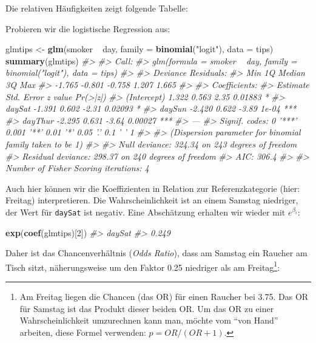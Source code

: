 \documentclass[12pt,ngerman,]{book}
\makeatletter
\newenvironment{Shaded}{\begin{snugshade}}{\end{snugshade}}
\newcommand{\KeywordTok}[1]{\textcolor[rgb]{0.13,0.29,0.53}{\textbf{{#1}}}}
\newcommand{\DataTypeTok}[1]{\textcolor[rgb]{0.13,0.29,0.53}{{#1}}}
\newcommand{\DecValTok}[1]{\textcolor[rgb]{0.00,0.00,0.81}{{#1}}}
\newcommand{\StringTok}[1]{\textcolor[rgb]{0.31,0.60,0.02}{{#1}}}
\newcommand{\CommentTok}[1]{\textcolor[rgb]{0.56,0.35,0.01}{\textit{{#1}}}}
\newcommand{\NormalTok}[1]{{#1}}
\let\rmarkdownfootnote\footnote%
\def\footnote{\protect\rmarkdownfootnote}
\newenvironment{kframe}{%
\medskip{}
\setlength{\fboxsep}{.8em}
 \def\at@end@of@kframe{}%
 \ifinner\ifhmode%
  \def\at@end@of@kframe{\end{minipage}}%
  \begin{minipage}{\columnwidth}%
 \fi\fi%
 \def\FrameCommand##1{\hskip\@totalleftmargin \hskip-\fboxsep
 \colorbox{shadecolor}{##1}\hskip-\fboxsep
     \hskip-\linewidth \hskip-\@totalleftmargin \hskip\columnwidth}%
 \MakeFramed {\advance\hsize-\width
   \@totalleftmargin\z@ \linewidth\hsize
   \@setminipage}}%
 {\par\unskip\endMakeFramed%
 \at@end@of@kframe}
\renewenvironment{Shaded}{\begin{kframe}}{\end{kframe}}
\makeatother
\begin{document}
Die relativen Häufigkeiten zeigt folgende Tabelle:

Probieren wir die logistische Regression aus:

\begin{Shaded}
\begin{Highlighting}[]
\NormalTok{glmtips <-}\StringTok{ }\KeywordTok{glm}\NormalTok{(smoker ~}\StringTok{ }\NormalTok{day, }
               \DataTypeTok{family =} \KeywordTok{binomial}\NormalTok{(}\StringTok{"logit"}\NormalTok{),}
               \DataTypeTok{data =} \NormalTok{tips)}
\KeywordTok{summary}\NormalTok{(glmtips)}
\CommentTok{#> }
\CommentTok{#> Call:}
\CommentTok{#> glm(formula = smoker ~ day, family = binomial("logit"), data = tips)}
\CommentTok{#> }
\CommentTok{#> Deviance Residuals: }
\CommentTok{#>    Min      1Q  Median      3Q     Max  }
\CommentTok{#> -1.765  -0.801  -0.758   1.207   1.665  }
\CommentTok{#> }
\CommentTok{#> Coefficients:}
\CommentTok{#>             Estimate Std. Error z value Pr(>|z|)    }
\CommentTok{#> (Intercept)    1.322      0.563    2.35  0.01883 *  }
\CommentTok{#> daySat        -1.391      0.602   -2.31  0.02093 *  }
\CommentTok{#> daySun        -2.420      0.622   -3.89    1e-04 ***}
\CommentTok{#> dayThur       -2.295      0.631   -3.64  0.00027 ***}
\CommentTok{#> ---}
\CommentTok{#> Signif. codes:  0 '***' 0.001 '**' 0.01 '*' 0.05 '.' 0.1 ' ' 1}
\CommentTok{#> }
\CommentTok{#> (Dispersion parameter for binomial family taken to be 1)}
\CommentTok{#> }
\CommentTok{#>     Null deviance: 324.34  on 243  degrees of freedom}
\CommentTok{#> Residual deviance: 298.37  on 240  degrees of freedom}
\CommentTok{#> AIC: 306.4}
\CommentTok{#> }
\CommentTok{#> Number of Fisher Scoring iterations: 4}
\end{Highlighting}
\end{Shaded}

Auch hier können wir die Koeffizienten in Relation zur Referenzkategorie
(hier: Freitag) interpretieren. Die Wahrscheinlichkeit ist an einem
Samstag niedriger, der Wert für \texttt{daySat} ist negativ. Eine
Abschätzung erhalten wir wieder mit \(e^{\beta_i}\):

\begin{Shaded}
\begin{Highlighting}[]
\KeywordTok{exp}\NormalTok{(}\KeywordTok{coef}\NormalTok{(glmtips)[}\DecValTok{2}\NormalTok{])}
\CommentTok{#> daySat }
\CommentTok{#>  0.249}
\end{Highlighting}
\end{Shaded}

Daher ist das Chancenverhältnis (\emph{Odds Ratio}), dass am Samstag ein
Raucher am Tisch sitzt, näherungsweise um den Faktor 0.25 niedriger als
am Freitag\footnote{Am Freitag liegen die Chancen (das OR) für einen
  Raucher bei 3.75. Das OR für Samstag ist das Produkt dieser beiden OR.
  Um das OR zu einer Wahrscheinlichkeit umzurechnen kann man, möchte vom
  ``von Hand'' arbeiten, diese Formel verwenden: \(p = OR / (OR + 1)\).}:
\end{document}
